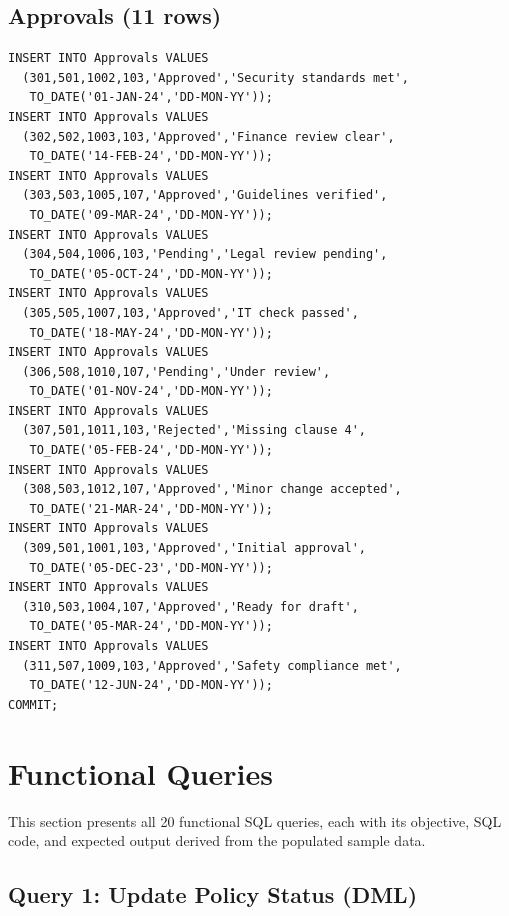 \documentclass[conference]{IEEEtran}
\begin{document}
\subsection{Approvals (11 rows)}
\begin{lstlisting}[style=sqlstyle, caption={DML: INSERT INTO Approvals}]
INSERT INTO Approvals VALUES
  (301,501,1002,103,'Approved','Security standards met',
   TO_DATE('01-JAN-24','DD-MON-YY'));
INSERT INTO Approvals VALUES
  (302,502,1003,103,'Approved','Finance review clear',
   TO_DATE('14-FEB-24','DD-MON-YY'));
INSERT INTO Approvals VALUES
  (303,503,1005,107,'Approved','Guidelines verified',
   TO_DATE('09-MAR-24','DD-MON-YY'));
INSERT INTO Approvals VALUES
  (304,504,1006,103,'Pending','Legal review pending',
   TO_DATE('05-OCT-24','DD-MON-YY'));
INSERT INTO Approvals VALUES
  (305,505,1007,103,'Approved','IT check passed',
   TO_DATE('18-MAY-24','DD-MON-YY'));
INSERT INTO Approvals VALUES
  (306,508,1010,107,'Pending','Under review',
   TO_DATE('01-NOV-24','DD-MON-YY'));
INSERT INTO Approvals VALUES
  (307,501,1011,103,'Rejected','Missing clause 4',
   TO_DATE('05-FEB-24','DD-MON-YY'));
INSERT INTO Approvals VALUES
  (308,503,1012,107,'Approved','Minor change accepted',
   TO_DATE('21-MAR-24','DD-MON-YY'));
INSERT INTO Approvals VALUES
  (309,501,1001,103,'Approved','Initial approval',
   TO_DATE('05-DEC-23','DD-MON-YY'));
INSERT INTO Approvals VALUES
  (310,503,1004,107,'Approved','Ready for draft',
   TO_DATE('05-MAR-24','DD-MON-YY'));
INSERT INTO Approvals VALUES
  (311,507,1009,103,'Approved','Safety compliance met',
   TO_DATE('12-JUN-24','DD-MON-YY'));
COMMIT;
\end{lstlisting}

\section{Functional Queries}

This section presents all 20 functional SQL queries, each with its objective, SQL code, and expected output derived from the populated sample data.

\subsection{Query 1: Update Policy Status (DML)}
\end{document}
